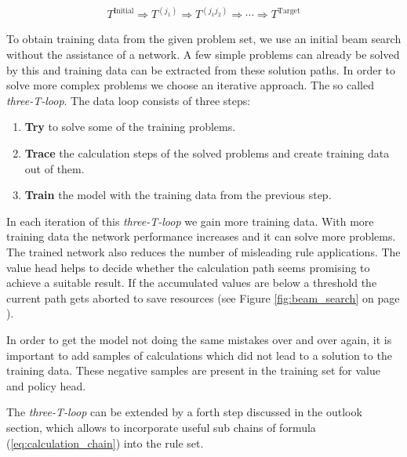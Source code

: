 \documentclass{scrartcl}
\theoremstyle{definition}
\begin{document}
\begin{align}
	T^\text{Initial} \Longrightarrow T^{(j_1)} \Longrightarrow T^{(j_1j_2)} \Longrightarrow \cdots \Longrightarrow T^\text{Target}
	\label{eq:calculation_chain}
\end{align}

To obtain training data from the given problem set, we use an initial beam search without the assistance of a network.
A few simple problems can already be solved by this and training data can be extracted from these solution paths.
In order to solve more complex problems we choose an iterative approach.
The so called \textit{three-T-loop}.
The data loop consists of three steps:


\begin{enumerate}[label=(\roman*)]
	\item \textbf{Try} to solve some of the training problems.
	\item \textbf{Trace} the calculation steps of the solved problems and create training data out of them. 
	\item \textbf{Train} the model with the training data from the previous step.
\end{enumerate}

In each iteration of this \textit{three-T-loop} we gain more training data.
With more training data the network performance increases and it can solve more problems.
The trained network also reduces the number of misleading rule applications.
The value head helps to decide whether the calculation path seems promising to achieve a suitable result.
If the accumulated values are below a threshold the current path gets aborted to save resources (see Figure \ref{fig:beam_search} on page \pageref{fig:beam_search}). 

In order to get the model not doing the same mistakes over and over again, it is important to add samples of calculations which did not lead to a solution to the training data. 
These negative samples are present in the training set for value and policy head.


The \textit{three-T-loop} can be extended by a forth step discussed in the outlook section, which allows to incorporate useful sub chains of formula (\ref{eq:calculation_chain}) into the rule set.
\end{document}
